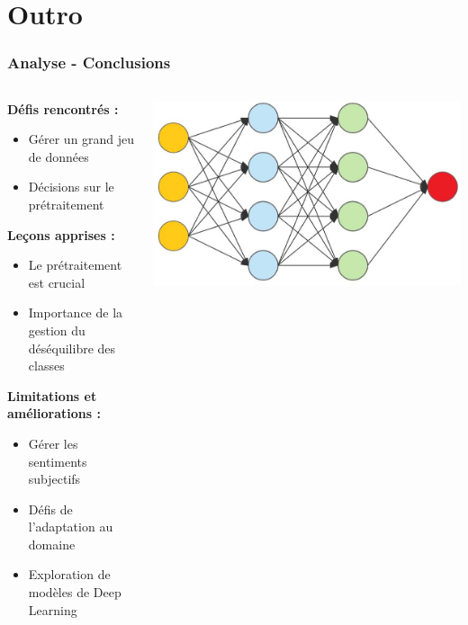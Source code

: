 \documentclass{beamer}
\begin{document}
\section{Outro}
\begin{frame}
\frametitle{Analyse - Conclusions}

\begin{columns}

\begin{column}{0.6\textwidth}
\textbf{Défis rencontrés :}
\begin{itemize}
\item Gérer un grand jeu de données
\item Décisions sur le prétraitement
\end{itemize}

\textbf{Leçons apprises :}
\begin{itemize}
\item Le prétraitement est crucial
\item Importance de la gestion du déséquilibre des classes
\end{itemize}

\textbf{Limitations et améliorations :}
\begin{itemize}
\item Gérer les sentiments subjectifs
\item Défis de l'adaptation au domaine
\item Exploration de modèles de Deep Learning
\end{itemize}

\end{column}

\begin{column}{0.5\textwidth}
\includegraphics[width=1\textwidth]{img_neural_networks.jpg}
\end{column}

\end{columns}

\end{frame}
\end{document}
